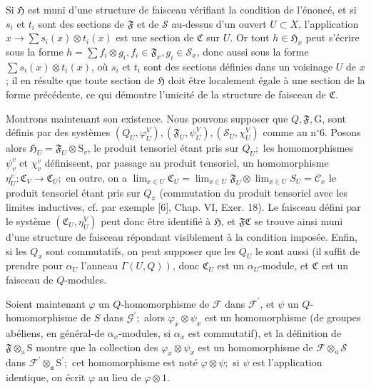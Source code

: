 Si $\mathfrak{H}$ est muni d'une structure de faisceau vérifiant la condition de l'énoncé, et si $s_{i}$ et $t_{i}$ sont des sections de $\mathfrak{F}$ et de $\mathcal{S}$ au-dessus d'un ouvert $U \subset X$, l'application $x \rightarrow \sum s_{i}(x) \otimes t_{i}(x)$ est une section de $\mathfrak{C}$ sur $U .$ Or tout $h \in \mathfrak{H}_{x}$ peut s'écrire sous la forme $h=\sum f_{i} \otimes g_{i}, f_{i} \in \mathfrak{F}_{x}, g_{i} \in \mathcal{S}_{x}$, donc aussi sous la forme $\sum s_{i}(x) \otimes t_{i}(x)$, où $s_{i}$ et $t_{i}$ sont des sections définies dans un voisinage $U$ de $x$; il en résulte que toute section de $\mathfrak{H}$ doit être localement égale à une section de la forme précédente, ce qui démontre l'unicité de la structure de faisceau de $\mathfrak{C}$.

Montrons maintenant son existence. Nous pouvons supposer que $Q, \mathfrak{F}, \mathrm{G}$, sont définis par des systèmes $\left(Q_{U}, \varphi_{U}^{V}\right),\left(\mathfrak{F}_{U}, \psi_{U}^{V}\right),\left(\mathcal{S}_{U}, \chi_{U}^{V}\right)$ comme au $\mathrm{n}^{\circ} 6$. Posons alors $\mathfrak{H}_{U}=\mathfrak{F}_{U} \otimes \mathrm{S}_{v}$, le produit tensoriel étant pris sur $Q_{U} ;$ les homomorphismes $\psi_{v}^{v}$ et $\chi_{v}^{v}$ définissent, par passage au produit tensoriel, un homomorphisme $\eta_{U}^{v}: \mathfrak{C}_{V} \rightarrow \mathfrak{C}_{U} ;$ en outre, on a $\lim _{x \in U} \mathfrak{C}_{U}=\lim _{x \in U} \mathfrak{F}_{U} \otimes \lim _{x \in U} S_{U}=\mathscr{C}_{x}$ le produit tensoriel étant pris sur $Q_{x}$ (commutation du produit tensoriel avec les limites inductives, cf. par exemple [6], Chap. VI, Exer. 18). Le faisceau défini par le système $\left(\mathfrak{C}_{U}, \eta_{U}^{V}\right)$ peut donc être identifié à $\mathfrak{H}$, et $\mathfrak{F C}$ se trouve ainsi muni d'une structure de faisceau répondant visiblement à la condition imposée. Enfin, si les $Q_{x}$ sont commutatifs, on peut supposer que les $Q_{U}$ le sont aussi (il suffit de prendre pour $\alpha_{U}$ l'anneau $\left.\Gamma(U, Q)\right)$, donc $\mathfrak{C}_{U}$ est un $\alpha_{U}$-module, et $\mathfrak{C}$ est un faisceau de $Q$-modules.

Soient maintenant $\varphi$ un $Q$-homomorphisme de $\mathcal{F}$ dans $\mathcal{F}^{\prime}$, et $\psi$ un $Q$-homomorphisme de $S$ dans $\mathcal{G}^{\prime} ;$ alors $\varphi_{x} \otimes \psi_{x}$ est un homomorphisme (de groupes abéliens, en général-de $\alpha_{x}$-modules, si $\alpha_{x}$ est commutatif), et la définition de $\mathfrak{F} \otimes_{\mathrm{a}} \mathrm{S}$ montre que la collection des $\varphi_{x} \otimes \psi_{x}$ est un homomorphisme de $\mathcal{F} \otimes_{a} \mathcal{S}$ dans $\mathcal{F}^{\prime} \otimes_{\mathfrak{a}} \mathrm{S}^{\prime} ;$ cet homomorphisme est noté $\varphi \otimes \psi ;$ si $\psi$ est l'application identique, on écrit $\varphi$ au lieu de $\varphi \otimes 1$.

